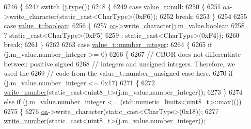 \begin{DoxyCode}
6246     \{
6247         \textcolor{keywordflow}{switch} (j.type())
6248         \{
6249             \textcolor{keywordflow}{case} \hyperlink{namespacenlohmann_1_1detail_a1ed8fc6239da25abcaf681d30ace4985a37a6259cc0c1dae299a7866489dff0bd}{value\_t::null}:
6250             \{
6251                 \hyperlink{classnlohmann_1_1detail_1_1binary__writer_a6f15b782a7900f50ef37d123008e601b}{oa}->write\_character(static\_cast<CharType>(0xF6));
6252                 \textcolor{keywordflow}{break};
6253             \}
6254 
6255             \textcolor{keywordflow}{case} \hyperlink{namespacenlohmann_1_1detail_a1ed8fc6239da25abcaf681d30ace4985a84e2c64f38f78ba3ea5c905ab5a2da27}{value\_t::boolean}:
6256             \{
6257                 \hyperlink{classnlohmann_1_1detail_1_1binary__writer_a6f15b782a7900f50ef37d123008e601b}{oa}->write\_character(j.m\_value.boolean
6258                                     ? static\_cast<CharType>(0xF5)
6259                                     : static\_cast<CharType>(0xF4));
6260                 \textcolor{keywordflow}{break};
6261             \}
6262 
6263             \textcolor{keywordflow}{case} \hyperlink{namespacenlohmann_1_1detail_a1ed8fc6239da25abcaf681d30ace4985a5763da164f8659d94a56e29df64b4bcc}{value\_t::number\_integer}:
6264             \{
6265                 \textcolor{keywordflow}{if} (j.m\_value.number\_integer >= 0)
6266                 \{
6267                     \textcolor{comment}{// CBOR does not differentiate between positive signed}
6268                     \textcolor{comment}{// integers and unsigned integers. Therefore, we used the}
6269                     \textcolor{comment}{// code from the value\_t::number\_unsigned case here.}
6270                     \textcolor{keywordflow}{if} (j.m\_value.number\_integer <= 0x17)
6271                     \{
6272                         \hyperlink{classnlohmann_1_1detail_1_1binary__writer_a62cfd50a511371e718f37ad7bb29ae9d}{write\_number}(static\_cast<uint8\_t>(j.m\_value.number\_integer));
6273                     \}
6274                     \textcolor{keywordflow}{else} \textcolor{keywordflow}{if} (j.m\_value.number\_integer <= (std::numeric\_limits<uint8\_t>::max)())
6275                     \{
6276                         \hyperlink{classnlohmann_1_1detail_1_1binary__writer_a6f15b782a7900f50ef37d123008e601b}{oa}->write\_character(static\_cast<CharType>(0x18));
6277                         \hyperlink{classnlohmann_1_1detail_1_1binary__writer_a62cfd50a511371e718f37ad7bb29ae9d}{write\_number}(static\_cast<uint8\_t>(j.m\_value.number\_integer));

\end{DoxyCode}
